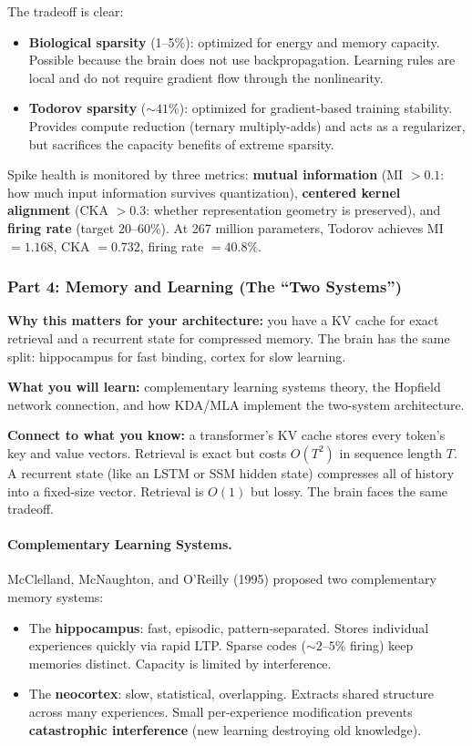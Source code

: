 \documentclass[11pt,a4paper]{article}
\begin{document}
The tradeoff is clear:
\begin{itemize}
  \item \textbf{Biological sparsity} (1--5\%): optimized for energy and memory capacity. Possible because the brain does not use backpropagation. Learning rules are local and do not require gradient flow through the nonlinearity.
  \item \textbf{Todorov sparsity} (${\sim}41\%$): optimized for gradient-based training stability. Provides compute reduction (ternary multiply-adds) and acts as a regularizer, but sacrifices the capacity benefits of extreme sparsity.
\end{itemize}

Spike health is monitored by three metrics: \textbf{mutual information} (MI $> 0.1$: how much input information survives quantization), \textbf{centered kernel alignment} (CKA $> 0.3$: whether representation geometry is preserved), and \textbf{firing rate} (target 20--60\%). At 267 million parameters, Todorov achieves MI $= 1.168$, CKA $= 0.732$, firing rate $= 40.8\%$.

\subsubsection{Part 4: Memory and Learning (The ``Two Systems'')}

\textbf{Why this matters for your architecture:} you have a KV cache for exact retrieval and a recurrent state for compressed memory. The brain has the same split: hippocampus for fast binding, cortex for slow learning.

\textbf{What you will learn:} complementary learning systems theory, the Hopfield network connection, and how KDA/MLA implement the two-system architecture.

\textbf{Connect to what you know:} a transformer's KV cache stores every token's key and value vectors. Retrieval is exact but costs $O(T^2)$ in sequence length $T$. A recurrent state (like an LSTM or SSM hidden state) compresses all of history into a fixed-size vector. Retrieval is $O(1)$ but lossy. The brain faces the same tradeoff.

\paragraph{Complementary Learning Systems.}

McClelland, McNaughton, and O'Reilly (1995) proposed two complementary memory systems:
\begin{itemize}
  \item The \textbf{hippocampus}: fast, episodic, pattern-separated. Stores individual experiences quickly via rapid LTP. Sparse codes (${\sim}2\text{--}5\%$ firing) keep memories distinct. Capacity is limited by interference.
  \item The \textbf{neocortex}: slow, statistical, overlapping. Extracts shared structure across many experiences. Small per-experience modification prevents \textbf{catastrophic interference} (new learning destroying old knowledge).
\end{itemize}
\end{document}
